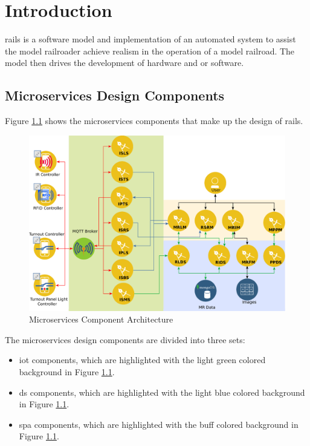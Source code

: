\chapter{Introduction}
\gls{rails} is a software model and implementation of an automated system to assist the model railroader achieve realism in the operation of a model railroad. The model then drives the development of hardware and or software.
\section{Microservices Design Components}
Figure \ref{fig:microarchitecture} shows the microservices components that make up the design of \gls{rails}.

\begin{figure}[H]
	\centering
		\includegraphics[scale=0.7]{../System/design.eps}
	\caption{Microservices Component Architecture}
	\label{fig:microarchitecture}
\end{figure}

The microservices design components are divided into three sets:
\begin{itemize}
  \item \gls{iot} components, which are highlighted with the light green colored background in Figure \ref{fig:microarchitecture}.
  \item \gls{ds} components, which are highlighted with the light blue colored background in Figure \ref{fig:microarchitecture}.
  \item \gls{spa} components, which are highlighted with the buff colored background in Figure \ref{fig:microarchitecture}.
\end{itemize}

